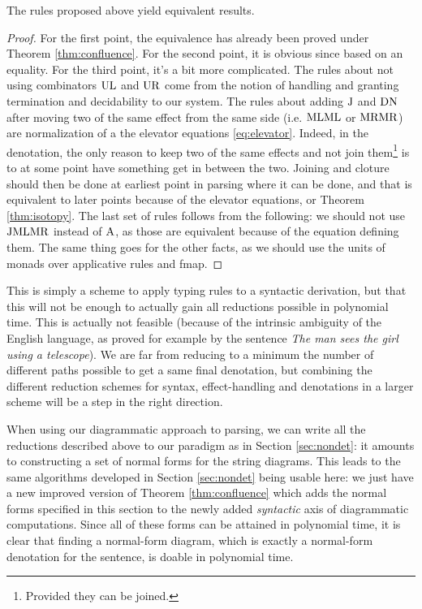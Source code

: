 \begin{thm}
	The rules proposed above yield equivalent results.
\end{thm}
\begin{proof}
	For the first point, the equivalence has already been proved under Theorem
	\ref{thm:confluence}.
	For the second point, it is obvious since based on an equality.
	For the third point, it's a bit more complicated.
	The rules about not using combinators $\text{UL}$ and $\text{UR}$ come from the
	notion of handling and granting termination and decidability to our system.
	The rules about adding $\text{J}$ and $\text{DN}$ after moving two of the same
	effect from the same side (i.e. $\text{ML} \text{ML}$ or $\text{MR}\text{MR}$) are
	normalization of a the elevator equations \ref{eq:elevator}.
	Indeed, in the denotation, the only reason to keep two of the same effects
	and not join them\footnote{Provided they can be joined.} is to at some point
	have something get in between the two.
	Joining and cloture should then be done at earliest point in parsing where it
	can be done, and that is equivalent to later points because of the elevator
	equations, or Theorem \ref{thm:isotopy}.
	The last set of rules follows from the following: we should not use $\text{J}
		\text{ML} \text{MR}$ instead of $\text{A}$, as those are equivalent because of the
	equation defining them.
	The same thing goes for the other facts, as we should use the units of monads
	over applicative rules and fmap.
\end{proof}

This is simply a scheme to apply typing rules to a syntactic derivation,
but that this will not be enough to actually gain all reductions possible
in polynomial time.
This is actually not feasible (because of the intrinsic ambiguity of the
English language, as proved for example by the sentence \emph{The man sees the
	girl using a telescope}).
We are far from reducing to a minimum the number of different paths
possible to get a same final denotation, but combining the different reduction
schemes for syntax, effect-handling and denotations in a larger scheme will be
a step in the right direction.

\medskip

When using our diagrammatic approach to parsing, we can write all the
reductions described above to our paradigm as in Section \ref{sec:nondet}:
it amounts to constructing a set of normal forms for the string diagrams.
This leads to the same algorithms developed in Section \ref{sec:nondet} being
usable here: we just have a new improved version of Theorem
\ref{thm:confluence} which adds the normal forms specified in this section to
the newly added \emph{syntactic} axis of diagrammatic computations.
Since all of these forms can be attained in polynomial time, it is clear that
finding a normal-form diagram, which is exactly a normal-form denotation for
the sentence, is doable in polynomial time.

